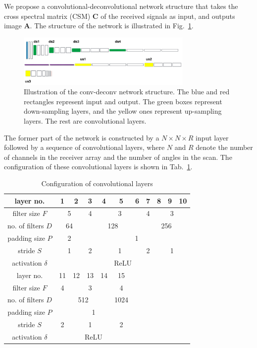 \documentclass{article}
\begin{document}
We propose a convolutional-deconvolutional network structure that takes the cross spectral matrix (CSM) $\mathbf{C}$ of the received signals as input, and outputs image $\mathbf{A}$. The structure of the network is illustrated in Fig.~\ref{fig:net_structure}.
\begin{figure}[htbp]
  \centering
  \centerline{\includegraphics[width=8.5cm]{net_structure}}
\caption{Illustration of the conv-deconv network structure. The blue and red rectangles represent input and output. The green boxes represent down-sampling layers, and the yellow ones represent up-sampling layers. The rest are convolutional layers.}
\label{fig:net_structure}
\end{figure}
The former part of the network is constructed by a $N \times N \times R$ input layer followed by a sequence of convolutional layers, where $N$ and $R$ denote the number of channels in the receiver array and the number of angles in the scan. The configuration of these convolutional layers is shown in Tab.~\ref{tab:conv_config}.
\begin{table}[htbp]
\center
\caption{Configuration of convolutional layers}
  \begin{tabular}{ c | c c c c c c c c c c}
    \hline
    layer no. & 1 & 2 & 3 & 4 & 5 & 6 & 7 & 8 & 9 & 10 \\
    \hline
    filter size $F$ & \multicolumn{2}{c|}{5} & 4 & \multicolumn{3}{|c|}{3} & 4 & \multicolumn{3}{|c}{3} \\
    \hline
    no. of filters $D$ & \multicolumn{2}{c|}{64} & \multicolumn{4}{c|}{128} & \multicolumn{4}{c}{256} \\
    \hline
    padding size $P$ & \multicolumn{2}{c|}{2} & \multicolumn{8}{c}{1} \\
    \hline
    stride $S$ & \multicolumn{2}{c|}{1} & 2 & \multicolumn{3}{|c|}{1} & 2 & \multicolumn{3}{|c}{1} \\
    \hline
    activation $\delta$ & \multicolumn{10}{c}{ReLU} \\
    \hline
    \hline
    layer no. & 11 & 12 & 13 & 14 & 15 \\
    \hline
    filter size $F$ & 4 & \multicolumn{3}{|c|}{3} & 4 \\
    \hline
    no. of filters $D$ & \multicolumn{4}{c|}{512} & 1024 \\
    \hline
    padding size $P$ & \multicolumn{5}{c}{1} \\
    \hline
    stride $S$ & 2 & \multicolumn{3}{|c|}{1} & 2 \\
    \hline
    activation $\delta$ & \multicolumn{5}{c}{ReLU} \\
    \hline
  \end{tabular}
  \label{tab:conv_config}
\end{table}
\end{document}

